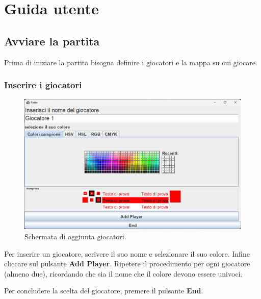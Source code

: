 \documentclass[a4paper,12pt]{report}
\begin{document}

\appendix
\chapter{Guida utente}
\section{Avviare la partita}
Prima di iniziare la partita bisogna definire i giocatori e la mappa su cui giocare.
\subsection{Inserire i giocatori}
\begin{figure}[H]
	\centering
	\includegraphics[width=1\textwidth]{user_guide/1_add_player.png}
	\caption{Schermata di aggiunta giocatori.}
\end{figure}
Per inserire un giocatore, scrivere il suo nome e selezionare il suo colore. Infine cliccare sul pulsante \textbf{Add Player}.
Ripetere il procedimento per ogni giocatore (almeno due), ricordando che sia il nome che il colore devono essere univoci.

Per concludere la scelta del giocatore, premere il pulsante \textbf{End}.
\end{document}
